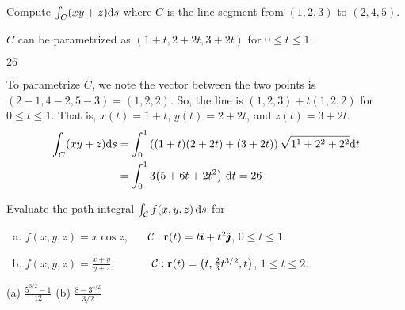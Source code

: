 \begin{question}
	Compute $\int_C (xy+z) \mathrm{d}s$ where $C$ is the line segment from $(1,2,3)$ to $(2,4,5)$.
\end{question}
\begin{hint}
	$C$ can be parametrized as $(1+t,2+2t,3+2t)$ for $0 \le t \le 1$.
\end{hint}
\begin{answer}
	$26$
\end{answer}
\begin{solution}
	To parametrize $C$, we note the vector between the two points is $(2-1,4-2,5-3)=(1,2,2)$. So, the line is $(1,2,3)+t(1,2,2)$ for $0 \le t \le 1$. That is, $x(t)=1+t$, $y(t)=2+2t$, and $z(t)=3+2t$.
	\begin{align*}
		\int_C(xy+z)\dee{s}&=\int_0^1 \left((1+t)(2+2t)+(3+2t)\right)\sqrt{1^1+2^2+2^2}\dee{t}\\
		&=              \int_0^1 3\big(5 + 6t + 2t^2\big)\ \dee{t}=26
		\end{align*}
\end{solution}


\begin{question}
Evaluate the path integral $\int_{\mathcal{C}} f(x,y,z)\,\mathrm{d}s$ for
\begin{enumerate}[(a)]
\item 
$f(x,y,z)=x\cos z$, \ \ \ $\mathcal{C}:\mathbf{r}(t)=t\hat{\pmb{\imath}}+t^2\hat{\pmb{\jmath}}$,
$0\le t\le 1$.

\item $f(x,y,z)=\frac{x+y}{y+z}$, \ \ \ \ \ \ 
$\mathcal{C}:\mathbf{r}(t)= \big(t,\frac{2}{3}t^{3/2},t\big)$,
$1\le t\le 2$.	
\end{enumerate}
\end{question}


\begin{answer}
(a) $\frac{5^{3/2}-1}{12}$\qquad
(b) $\frac{8-3^{3/2}}{3/2}$	
\end{answer}

